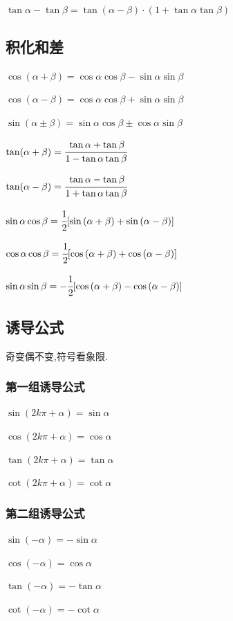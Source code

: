 {{  $\tan\alpha - \tan\beta = \tan(\alpha - \beta) \cdot (1 + \tan\alpha\tan\beta)$
}%

\subsection{积化和差}{
  $\cos(\alpha + \beta) = \cos{\alpha}\cos{\beta} - \sin{\alpha}\sin{\beta}$

  $\cos(\alpha - \beta) = \cos{\alpha}\cos{\beta} + \sin{\alpha}\sin{\beta}$

  $\sin(\alpha \pm \beta) = \sin{\alpha}\cos{\beta} \pm \cos{\alpha}\sin{\beta}$

  $\tan(\alpha + \beta) = \cfrac{\tan\alpha + \tan\beta}{1 - \tan\alpha\tan\beta}$

  $\tan(\alpha - \beta) = \cfrac{\tan\alpha - \tan\beta}{1 + \tan\alpha\tan\beta}$

  $\sin{\alpha}\cos{\beta} = \cfrac{1}{2}[\sin{(\alpha + \beta)} + \sin{(\alpha - \beta)}]$

  $\cos{\alpha}\cos{\beta} = \cfrac{1}{2}[\cos{(\alpha + \beta)} + \cos{(\alpha - \beta)}]$

  $\sin{\alpha}\sin{\beta} = -\cfrac{1}{2}[\cos{(\alpha + \beta)} - \cos{(\alpha - \beta)}]$
}%

\subsection{诱导公式}{
  \indent 奇变偶不变,符号看象限.
  \subsubsection{第一组诱导公式}{
    $\sin{(2k\pi + \alpha)} = \sin{\alpha}$

    $\cos{(2k\pi + \alpha)} = \cos{\alpha}$

    $\tan(2k\pi + \alpha) = \tan\alpha$

    $\cot(2k\pi + \alpha) = \cot\alpha$
  }%

  \subsubsection{第二组诱导公式}{
    $\sin(-\alpha) = -\sin\alpha$

    $\cos(-\alpha) = \cos\alpha$

    $\tan(-\alpha) = -\tan\alpha$

    $\cot(-\alpha) = -\cot\alpha$
  }%

}}
